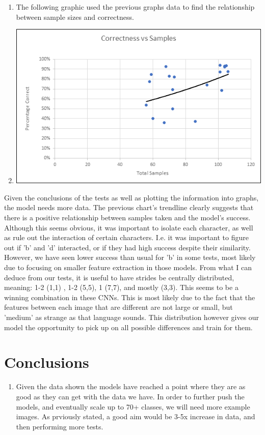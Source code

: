 \documentclass[12pt]{article} %
\begin{document}
\begin{enumerate}[label = (\roman*)]
\item The following graphic used the previous graphs data to find the relationship between sample sizes and correctness.
\item\includegraphics {charts/correct-vs-samples}
\end{enumerate}
Given the conclusions of the tests as well as plotting the information into graphs, the model needs more data. The previous chart's trendline clearly suggests that there is a positive relationship between samples taken and the model's success. Although this seems obvious, it was important to isolate each character, as well as rule out the interaction of certain characters. I.e. it was important to figure out if 'b' and 'd' interacted, or if they had high success despite their similarity. However, we have seen lower success than usual for 'b' in some tests, most likely due to focusing on smaller feature extraction in those models. From what I can deduce from our tests, it is useful to have strides be centrally distributed, meaning: 1-2 (1,1) , 1-2 (5,5), 1 (7,7), and mostly (3,3). This seems to be a winning combination in these CNNs. This is most likely due to the fact that the features between each image that are different are not large or small, but 'medium' as strange as that language sounds. This distribution however gives our model the opportunity to pick up on all possible differences and train for them.



\section{Conclusions}
\noindent\makebox[\linewidth]{\rule{15cm}{0.4pt}}
\begin{enumerate}[label = (\roman*)]
\item Given the data shown the models have reached a point where they are as good as they can get with the data we have. In order to further push the models, and eventually scale up to 70+ classes, we will need more example images. As prviously stated, a good aim would be 3-5x increase in data, and then performing more tests.
\end{enumerate}
\end{document}
